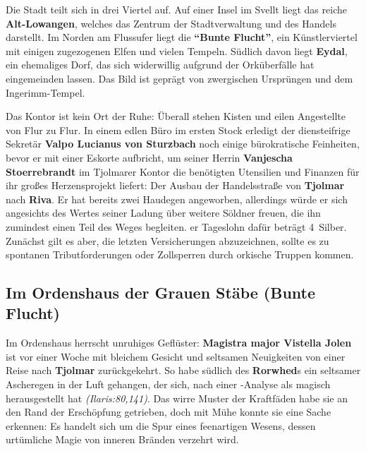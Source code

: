 Die Stadt teilt sich in drei Viertel auf. Auf einer Insel im Svellt liegt das reiche \textbf{Alt-Lowangen}, welches das Zentrum der Stadtverwaltung und des Handels darstellt. Im Norden am Flussufer liegt die \textbf{\enquote{Bunte Flucht}}, ein Künstlerviertel mit einigen zugezogenen Elfen und vielen Tempeln.
Südlich davon liegt \textbf{Eydal}, ein ehemaliges Dorf, das sich widerwillig aufgrund der Orküberfälle hat eingemeinden lassen.
Das Bild ist geprägt von zwergischen Ursprüngen und dem Ingerimm-Tempel.


Das Kontor ist kein Ort der Ruhe:
Überall stehen Kisten und eilen Angestellte von Flur zu Flur. In einem edlen Büro im ersten Stock erledigt der diensteifrige Sekretär \textbf{Valpo Lucianus von Sturzbach} noch einige bürokratische Feinheiten, bevor er mit einer Eskorte aufbricht,
	um seiner Herrin \textbf{Vanjescha Stoerrebrandt} im Tjolmarer Kontor die benötigten Utensilien und Finanzen für ihr großes Herzensprojekt liefert:
	Der Ausbau der Handelsstraße von \textbf{Tjolmar} nach \textbf{Riva}.
	Er hat bereits zwei Haudegen angeworben, allerdings würde er sich angesichts des Wertes seiner Ladung über weitere Söldner freuen, die ihn zumindest einen Teil des Weges begleiten. 
	er Tageslohn dafür beträgt 4~Silber. Zunächst gilt es aber, die letzten Versicherungen abzuzeichnen, sollte es zu spontanen Tributforderungen oder Zollsperren durch orkische Truppen kommen.


\subsection[Im Ordenshaus der Grauen Stäbe]{Im Ordenshaus der Grauen Stäbe (Bunte Flucht)}
Im Ordenshaus herrscht unruhiges Geflüster: \textbf{Magistra major Vistella Jolen} ist vor einer Woche mit bleichem Gesicht und seltsamen Neuigkeiten von einer Reise nach \textbf{Tjolmar} zurückgekehrt. So habe südlich des \textbf{Rorwhed}s ein seltsamer Ascheregen in der Luft gehangen, der sich, nach einer -Analyse als magisch herausgestellt hat \emph{(Ilaris:80,141)}.
Das wirre Muster der Kraftfäden habe sie an den Rand der Erschöpfung getrieben, doch mit Mühe konnte sie eine Sache erkennen:
Es handelt sich um die Spur eines feenartigen Wesens, dessen urtümliche Magie von inneren Bränden verzehrt wird.

